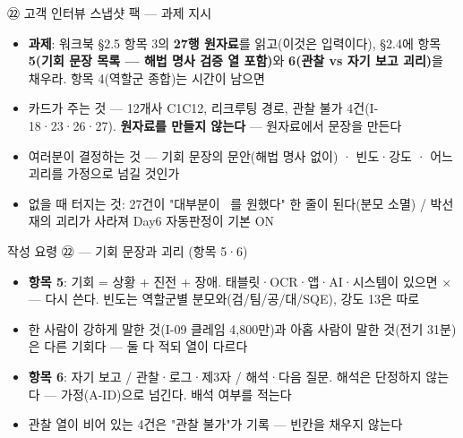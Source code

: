 \begin{frame}{㉒ 고객 인터뷰 스냅샷 팩 — 과제 지시}
\begin{itemize}
\item \textbf{과제}: 워크북 §2.5 항목 3의 \textbf{27행 원자료}를 읽고(이것은 입력이다), §2.4에 항목 \textbf{5(기회 문장 목록 — 해법 명사 검증 열 포함)}와 \textbf{6(관찰 vs 자기 보고 괴리)}을 채우라. 항목 4(역할군 종합)는 시간이 남으면
\item 카드가 주는 것 — 12개사 C1\til{}C12, 리크루팅 경로, 관찰 불가 4건(I-18·23·26·27). \textbf{원자료를 만들지 않는다} — 원자료에서 문장을 만든다
\item 여러분이 결정하는 것 — 기회 문장의 문안(해법 명사 없이) · 빈도·강도 · 어느 괴리를 가정으로 넘길 것인가
\item 없을 때 터지는 것: 27건이 "대부분이 ~를 원했다" 한 줄이 된다(분모 소멸) / 박선재의 괴리가 사라져 Day6 자동판정이 기본 ON
\end{itemize}
\end{frame}

\begin{frame}{작성 요령 ㉒ — 기회 문장과 괴리 (항목 5·6)}
\begin{itemize}
\item \textbf{항목 5}: 기회 = 상황 + 진전 + 장애. 태블릿·OCR·앱·AI·시스템이 있으면 × — 다시 쓴다. 빈도는 역할군별 분모와(검/팀/공/대/SQE), 강도 1\til{}3은 따로
\item 한 사람이 강하게 말한 것(I-09 클레임 4,800만)과 아홉 사람이 말한 것(전기 31분)은 다른 기회다 — 둘 다 적되 열이 다르다
\item \textbf{항목 6}: 자기 보고 / 관찰·로그·제3자 / 해석·다음 질문. 해석은 단정하지 않는다 — 가정(A-ID)으로 넘긴다. 배석 여부를 적는다
\item 관찰 열이 비어 있는 4건은 "관찰 불가"가 기록 — 빈칸을 채우지 않는다
\end{itemize}
\end{frame}

